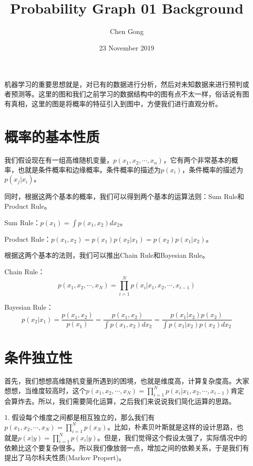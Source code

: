 \documentclass[a4paper]{article}
\title{Probability Graph 01 Background}
\author{Chen Gong}
\date{23 November 2019}
\begin{document}
\maketitle
机器学习的重要思想就是，对已有的数据进行分析，然后对未知数据来进行预判或者预测等。这里的图和我们之前学习的数据结构中的图有点不太一样，俗话说有图有真相，这里的图是将概率的特征引入到图中，方便我们进行直观分析。

\section{概率的基本性质}
我们假设现在有一组高维随机变量，$p(x_1,x_2,\cdots,x_n)$，它有两个非常基本的概率，也就是条件概率和边缘概率。条件概率的描述为$p(x_i)$，条件概率的描述为$p(x_j|x_i)$。

同时，根据这两个基本的概率，我们可以得到两个基本的运算法则：Sum Rule和Product Rule。

Sum Rule：$p(x_1)=\int p(x_1,x_2)dx_2$。

Product Rule：$p(x_1,x_2) = p(x_1)p(x_2|x_1) = p(x_2)p(x_1|x_2)$。

根据这两个基本的法则，我们可以推出Chain Rule和Bayesian Rule。

Chain Rule：
\begin{equation}
   p(x_1,x_2,\cdots,x_N) = \prod_{i=1}^N p(x_i|x_1,x_2,\cdots,x_{i-1}) 
\end{equation}


Bayesian Rule：
\begin{equation}
    p(x_2|x_1) = \frac{p(x_1,x_2)}{p(x_1)} = \frac{p(x_1,x_2)}{\int p(x_1,x_2)dx_2} = \frac{p(x_1|x_2)p(x_2)}{\int p(x_1|x_2)p(x_2)dx_2}
\end{equation}

\section{条件独立性}

首先，我们想想高维随机变量所遇到的困境，也就是维度高，计算复杂度高。大家想想，当维度较高时，这个$p(x_1,x_2,\cdots,x_N) = \prod_{i=1}^N p(x_i|x_1,x_2,\cdots,x_{i-1}) $肯定会算炸去。所以，我们需要简化运算，之后我们来说说我们简化运算的思路。

1. 假设每个维度之间都是相互独立的，那么我们有$p(x_1,x_2,\cdots,x_N)=\prod_{i=1}^N p(x_N)$。比如，朴素贝叶斯就是这样的设计思路，也就是$p(x|y)=\prod_{i=1}^N p(x_i|y)$。但是，我们觉得这个假设太强了，实际情况中的依赖比这个要复杂很多。所以我们像放弱一点，增加之间的依赖关系，于是我们有提出了马尔科夫性质(Markov Propert)。
\end{document}
